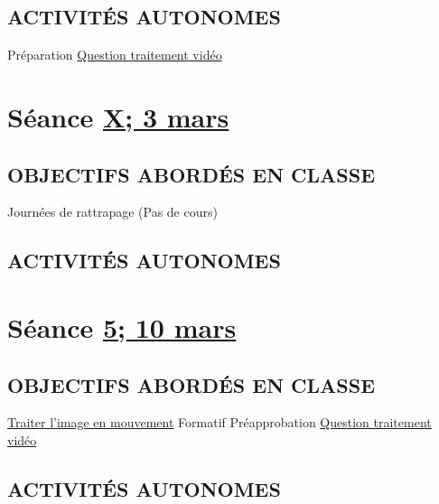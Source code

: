 \documentclass[
  french,
]{book}
\begin{document}
\hypertarget{activituxe9s-autonomes-3}{%
\subsection{ACTIVITÉS AUTONOMES}\label{activituxe9s-autonomes-3}}

Préparation \protect\hyperlink{sommatif_2}{Question traitement vidéo}

\hypertarget{semaine_5}{%
\section{\texorpdfstring{Séance \protect\hyperlink{semaine_5}{X; 3 mars}}{Séance X; 3 mars}}\label{semaine_5}}

\hypertarget{objectifs-aborduxe9s-en-classe-4}{%
\subsection{OBJECTIFS ABORDÉS EN CLASSE}\label{objectifs-aborduxe9s-en-classe-4}}

Journées de rattrapage (Pas de cours)

\hypertarget{activituxe9s-autonomes-4}{%
\subsection{ACTIVITÉS AUTONOMES}\label{activituxe9s-autonomes-4}}

\hypertarget{semaine_6}{%
\section{\texorpdfstring{Séance \protect\hyperlink{semaine_6}{5; 10 mars}}{Séance 5; 10 mars}}\label{semaine_6}}

\hypertarget{objectifs-aborduxe9s-en-classe-5}{%
\subsection{OBJECTIFS ABORDÉS EN CLASSE}\label{objectifs-aborduxe9s-en-classe-5}}

\protect\hyperlink{traiter}{Traiter l'image en mouvement}
Formatif Préapprobation \protect\hyperlink{sommatif_2}{Question traitement vidéo}

\hypertarget{activituxe9s-autonomes-5}{%
\subsection{ACTIVITÉS AUTONOMES}\label{activituxe9s-autonomes-5}}
\end{document}
